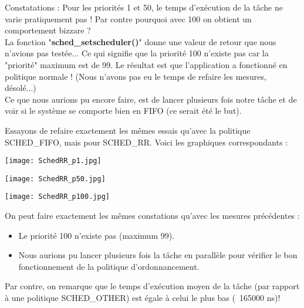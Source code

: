 Constatations : Pour les priorités 1 et 50, le temps d'exécution de la tâche ne varie pratiquement pas ! Par contre pourquoi avec 100 on obtient un comportement bizzare ? \\

La fonction "\textbf{sched\_setscheduler()}" donne une valeur de retour que nous n'avions pas testée... Ce qui signifie que la priorité 100 n'existe pas car la "priorité" maximum est de 99. Le résultat est que l'application a fonctionné en politique normale ! (Nous n'avons pas eu le temps de refaire les mesures, désolé...)\\

Ce que nous aurions pu encore faire, est de lancer plusieurs fois notre tâche et de voir si le système se comporte bien en FIFO (ce serait été le but).

\pagebreak Essayons de refaire exactement les mêmes essais qu'avec la politique SCHED\_FIFO, mais pour SCHED\_RR. Voici les graphiques correspondants :

\begin{center} 
\hspace{12.45cm}
\texttt{[image: SchedRR\_p1.jpg]}
\end{center}
\vspace{0.5cm}

\begin{center} 
\hspace{12.45cm}
\texttt{[image: SchedRR\_p50.jpg]}
\end{center}
\vspace{0.5cm}

\begin{center} 
\hspace{12.45cm}
\texttt{[image: SchedRR\_p100.jpg]}
\end{center}
\vspace{0.5cm}

On peut faire exactement les mêmes constations qu'avec les mesures précédentes :
\begin{itemize}
\item Le priorité 100 n'existe pas (maximum 99).
\item Nous aurions pu lancer plusieurs fois la tâche en parallèle pour vérifier le bon fonctionnement de la politique d'ordonnancement.\\
\end{itemize} 

Par contre, on remarque que le temps d'exécution moyen de la tâche (par rapport à une politique SCHED\_OTHER) est égale à celui le plus bas (~165000 ns)! 

